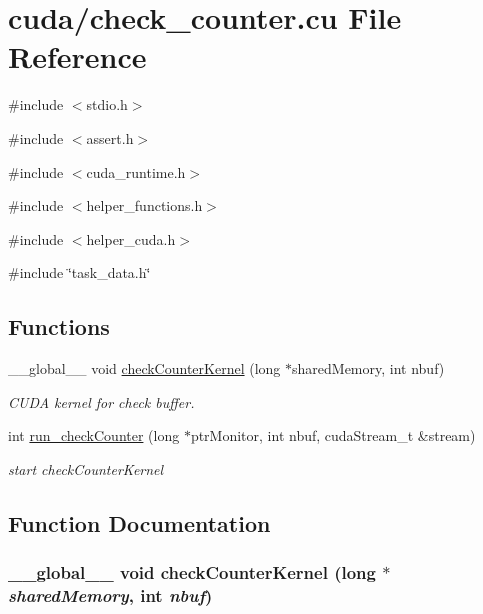 \hypertarget{check__counter_8cu}{
\section{cuda/check\_\-counter.cu File Reference}
\label{check__counter_8cu}
}
{\ttfamily \#include $<$stdio.h$>$}\par
{\ttfamily \#include $<$assert.h$>$}\par
{\ttfamily \#include $<$cuda\_\-runtime.h$>$}\par
{\ttfamily \#include $<$helper\_\-functions.h$>$}\par
{\ttfamily \#include $<$helper\_\-cuda.h$>$}\par
{\ttfamily \#include \char`\"{}task\_\-data.h\char`\"{}}\par
\subsection*{Functions}
\begin{DoxyCompactItemize}
\item 
\_\-\_\-global\_\-\_\- void \hyperlink{check__counter_8cu_a3ae4bf3f0cbc22f9b180089ff143dd1d}{checkCounterKernel} (long $\ast$sharedMemory, int nbuf)
\begin{DoxyCompactList}\small\item\em CUDA kernel for check buffer. \item\end{DoxyCompactList}\item 
int \hyperlink{check__counter_8cu_ac9565e5590f3a246a043817906fc9965}{run\_\-checkCounter} (long $\ast$ptrMonitor, int nbuf, cudaStream\_\-t \&stream)
\begin{DoxyCompactList}\small\item\em start checkCounterKernel \item\end{DoxyCompactList}\end{DoxyCompactItemize}


\subsection{Function Documentation}
\hypertarget{check__counter_8cu_a3ae4bf3f0cbc22f9b180089ff143dd1d}{
\subsubsection[{checkCounterKernel}]{\setlength{\rightskip}{0pt plus 5cm}\_\-\_\-global\_\-\_\- void checkCounterKernel (long $\ast$ {\em sharedMemory}, \/  int {\em nbuf})}}
\label{check__counter_8cu_a3ae4bf3f0cbc22f9b180089ff143dd1d}


